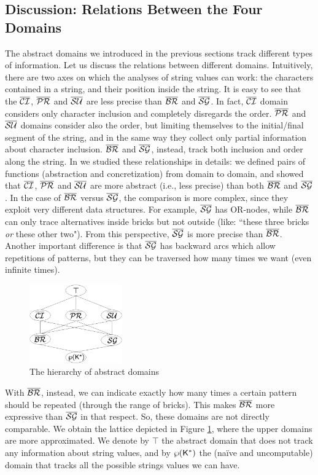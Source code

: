 \documentclass[orivec]{llncs}
\begin{document}
 
 
\subsection{Discussion: Relations Between the Four Domains}
The abstract domains we introduced in the previous sections track different types of information. Let us discuss the relations between different domains. Intuitively, there are two axes on which the analyses of string values can work: the characters contained in a string, and their position inside the string. It is easy to see that the $\mathsf{\overline{\mathsf{\mathcal{CI}}}}$, $\mathsf{\overline{\mathsf{\mathcal{PR}}}}$ and $\mathsf{\overline{\mathsf{\mathcal{SU}}}}$ are less precise than $\mathsf{\overline{\mathsf{\mathcal{BR}}}}$ and $\mathsf{\overline{\mathsf{\mathcal{SG}}}}$. In fact, $\mathsf{\overline{\mathsf{\mathcal{CI}}}}$ domain considers only character inclusion and completely disregards the order. $\mathsf{\overline{\mathsf{\mathcal{PR}}}}$ and $\mathsf{\overline{\mathsf{\mathcal{SU}}}}$ domains consider also the order, but limiting themselves to the initial/final segment of the string, and in the same way they collect only partial information about character inclusion. $\mathsf{\overline{\mathsf{\mathcal{BR}}}}$ and $\mathsf{\overline{\mathsf{\mathcal{SG}}}}$, instead, track both inclusion and order along the string. In \cite{GiuliaMaster} we studied these relationships in details: we defined pairs of functions (abstraction and concretization) from domain to domain, and showed that $\mathsf{\overline{\mathsf{\mathcal{CI}}}}$, $\mathsf{\overline{\mathsf{\mathcal{PR}}}}$ and $\mathsf{\overline{\mathsf{\mathcal{SU}}}}$ are more abstract (i.e., less precise) than both $\mathsf{\overline{\mathsf{\mathcal{BR}}}}$ and $\mathsf{\overline{\mathsf{\mathcal{SG}}}}$. In the case of $\mathsf{\overline{\mathsf{\mathcal{BR}}}}$ versus $\mathsf{\overline{\mathsf{\mathcal{SG}}}}$, the comparison is more complex, since they exploit very different data structures. For example, $\mathsf{\overline{\mathsf{\mathcal{SG}}}}$ has OR-nodes, while $\mathsf{\overline{\mathsf{\mathcal{BR}}}}$ can only trace alternatives inside bricks but not outside (like: ``these three bricks \textit{or} these other two"). From this perspective, $\mathsf{\overline{\mathsf{\mathcal{SG}}}}$ is more precise than $\mathsf{\overline{\mathsf{\mathcal{BR}}}}$. Another important difference is that $\mathsf{\overline{\mathsf{\mathcal{SG}}}}$ has backward arcs which allow repetitions of patterns, but they can be traversed how many times we want (even infinite times). 
\begin{figure}
  \begin{center}
    \includegraphics[width=4cm]{domainofdomains.eps}
  \end{center}
\caption{The hierarchy of abstract domains}
\label{fig:domainlattice}
\vspace{-10pt}
\end{figure}
With $\mathsf{\overline{\mathsf{\mathcal{BR}}}}$, instead, we can indicate exactly how many times a certain pattern should be repeated (through the range of bricks). 
This makes $\mathsf{\overline{\mathsf{\mathcal{BR}}}}$ more expressive than $\mathsf{\overline{\mathsf{\mathcal{SG}}}}$ in that respect. So, these domains are not directly comparable. 
We obtain the lattice depicted in Figure \ref{fig:domainlattice}, where the upper domains are more approximated. We denote by $\top$ the abstract domain that does not track any information about string values, and by $\wp(\mathsf{K}^*)$ the (na\"ive and uncomputable) domain that tracks all the possible strings values we can have.
\end{document}
